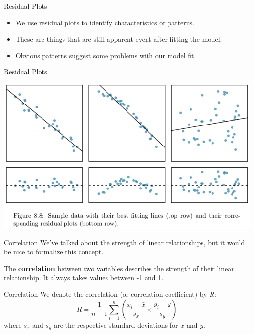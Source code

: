 \begin{frame}{Residual Plots}
    \begin{itemize}
        \item We use residual plots to identify characteristics or patterns.
        \item These are things that are still apparent event after fitting the model.
        \item Obvious patterns suggest some problems with our model fit.
    \end{itemize}
\end{frame}

\begin{frame}{Residual Plots}
    \begin{center}
        \includegraphics[scale=0.3]{images/residplots.png}
    \end{center}
\end{frame}

\begin{frame}{Correlation}
    We've talked about the strength of linear relationships, but it would be nice to formalize this concept.
    
    \vspace{12pt}The \textbf{correlation} between two variables describes the strength of their linear relationship. It always takes values between -1 and 1. 
\end{frame}

\begin{frame}{Correlation}
    We denote the correlation (or correlation coefficient) by $R$:
    \[
        R = \frac{1}{n-1}\sum_{i=1}^{n}\left(\frac{x_i - \bar{x}}{s_x}\times\frac{y_i - \bar{y}}{s_y}\right)
    \]
    where $s_x$ and $s_y$ are the respective standard deviations for $x$ and $y$.
\end{frame}

